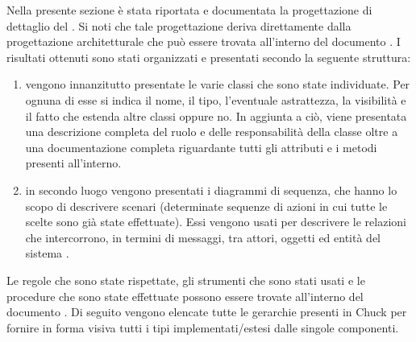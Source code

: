         Nella presente sezione è stata riportata e documentata la progettazione di dettaglio del  . Si noti che tale progettazione deriva direttamente dalla progettazione architetturale che può essere trovata all'interno del documento . I risultati ottenuti sono stati organizzati e presentati secondo la seguente struttura:
        \begin{enumerate}
            \item vengono innanzitutto presentate le varie classi che sono state individuate. Per ognuna di esse si indica il nome, il tipo, l'eventuale astrattezza, la visibilità e il fatto che estenda altre classi oppure no. In aggiunta a ciò, viene presentata una descrizione completa del ruolo e delle responsabilità della classe oltre a una documentazione completa riguardante tutti gli attributi e i metodi presenti all'interno.
            \item in secondo luogo vengono presentati i diagrammi di sequenza, che hanno lo scopo di descrivere scenari (determinate sequenze di azioni in cui tutte le scelte sono già state effettuate). Essi vengono usati per descrivere le relazioni che intercorrono, in termini di messaggi, tra attori, oggetti ed entità del sistema .
        \end{enumerate}
        Le regole che sono state rispettate, gli strumenti che sono stati usati e le procedure che sono state effettuate possono essere trovate all'interno del documento .
            Di seguito vengono elencate tutte le gerarchie presenti in Chuck per fornire in forma visiva tutti i tipi implementati/estesi dalle singole componenti.
